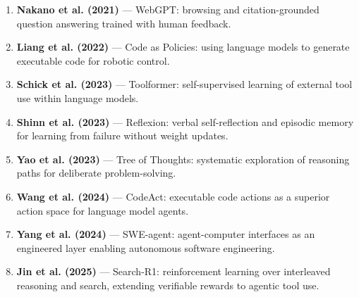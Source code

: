 \begin{enumerate}
\item \textbf{Nakano et al. (2021)} --- WebGPT: browsing and citation-grounded question answering trained with human feedback.

\item \textbf{Liang et al. (2022)} --- Code as Policies: using language models to generate executable code for robotic control.

\item \textbf{Schick et al. (2023)} --- Toolformer: self-supervised learning of external tool use within language models.

\item \textbf{Shinn et al. (2023)} --- Reflexion: verbal self-reflection and episodic memory for learning from failure without weight updates.

\item \textbf{Yao et al. (2023)} --- Tree of Thoughts: systematic exploration of reasoning paths for deliberate problem-solving.

\item \textbf{Wang et al. (2024)} --- CodeAct: executable code actions as a superior action space for language model agents.

\item \textbf{Yang et al. (2024)} --- SWE-agent: agent-computer interfaces as an engineered layer enabling autonomous software engineering.

\item \textbf{Jin et al. (2025)} --- Search-R1: reinforcement learning over interleaved reasoning and search, extending verifiable rewards to agentic tool use.

\end{enumerate}
